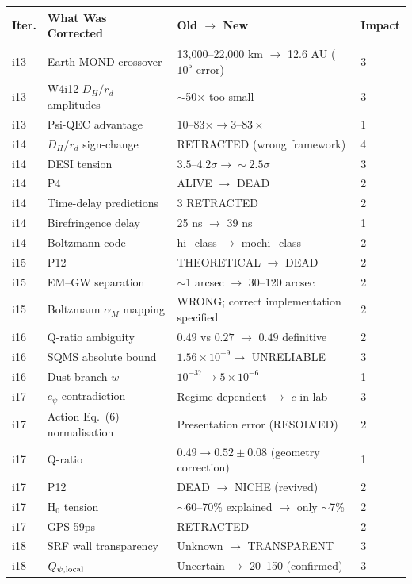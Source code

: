 \documentclass[11pt,a4paper]{article}
\newcommand{\ee}[1]{\times 10^{#1}}
\begin{document}
\begin{longtable}{p{1cm}p{5cm}p{5cm}p{2cm}}
\toprule
\textbf{Iter.} & \textbf{What Was Corrected} & \textbf{Old $\to$ New} &
\textbf{Impact} \\
\midrule
\endfirsthead

i13 & Earth MOND crossover & 13,000--22,000 km $\to$ 12.6 AU ($10^5$ error) & 3 \\
i13 & W4i12 $D_H/r_d$ amplitudes & $\sim$50$\times$ too small & 3 \\
i13 & Psi-QEC advantage & $10$--$83\times \to 3$--$83\times$ & 1 \\
i14 & $D_H/r_d$ sign-change & RETRACTED (wrong framework) & 4 \\
i14 & DESI tension & $3.5$--$4.2\sigma \to \sim 2.5\sigma$ & 3 \\
i14 & P4 & ALIVE $\to$ DEAD & 2 \\
i14 & Time-delay predictions & 3 RETRACTED & 2 \\
i14 & Birefringence delay & 25 ns $\to$ 39 ns & 1 \\
i14 & Boltzmann code & hi\_class $\to$ mochi\_class & 2 \\
i15 & P12 & THEORETICAL $\to$ DEAD & 2 \\
i15 & EM--GW separation & $\sim$1 arcsec $\to$ 30--120 arcsec & 2 \\
i15 & Boltzmann $\alpha_M$ mapping & WRONG; correct implementation specified & 2 \\
i16 & Q-ratio ambiguity & $0.49$ vs $0.27$ $\to$ $0.49$ definitive & 2 \\
i16 & SQMS absolute bound & $1.56\ee{-9} \to$ UNRELIABLE & 3 \\
i16 & Dust-branch $w$ & $10^{-37} \to 5\ee{-6}$ & 1 \\
i17 & $c_\psi$ contradiction & Regime-dependent $\to$ $c$ in lab & 3 \\
i17 & Action Eq.~(6) normalisation & Presentation error (RESOLVED) & 2 \\
i17 & Q-ratio & $0.49 \to 0.52 \pm 0.08$ (geometry correction) & 1 \\
i17 & P12 & DEAD $\to$ NICHE (revived) & 2 \\
i17 & H$_0$ tension & $\sim$60--70\% explained $\to$ only $\sim$7\% & 2 \\
i17 & GPS 59ps & RETRACTED & 2 \\
i18 & SRF wall transparency & Unknown $\to$ TRANSPARENT & 3 \\
i18 & $Q_{\psi,\rm local}$ & Uncertain $\to$ 20--150 (confirmed) & 3 \\

\end{longtable}
\end{document}
